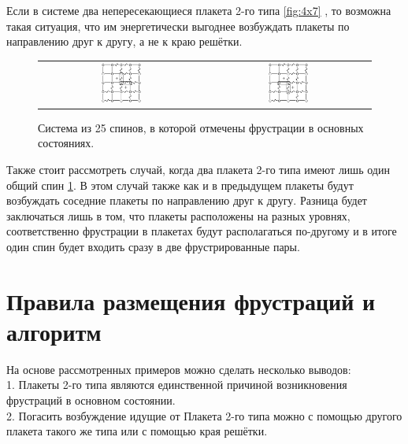 \documentclass[utf8, babel, sor, jor, amsmath, amssymb, reprint]{elsarticle} %
\begin{document}
Если в системе два непересекающиеся плакета 2-го типа \ref{fig:4x7} , то возможна такая ситуация, что им энергетически выгоднее возбуждать плакеты по направлению друг к другу, а не к краю решётки.

\begin{figure}[H]
	\centering
	\begin{tabular}{cc}
		\includegraphics[width=0.25\textwidth]{1_Cl5x5_Type2_gs1.eps} & \hspace{0.05\textwidth}
		\includegraphics[width=0.25\textwidth]{1_Cl5x5_Type2_gs2.eps} 
	\end{tabular}
	\caption{Система из 25 спинов, в которой отмечены фрустрации в основных состояниях.}
	\label{fig:5x5.22F}
\end{figure}

Также стоит рассмотреть случай, когда два плакета 2-го типа имеют лишь один общий спин \ref{fig:5x5.22F}.
В этом случай также как и в предыдущем плакеты будут возбуждать соседние плакеты по направлению друг к другу. Разница будет заключаться лишь в том, что плакеты расположены на разных уровнях, соответственно фрустрации в плакетах будут располагаться по-другому и в итоге один спин будет входить сразу в две фрустрированные пары.

\section{Правила размещения фрустраций и алгоритм}

На основе рассмотренных примеров можно сделать несколько выводов: \\
1. Плакеты 2-го типа являются единственной причиной возникновения фрустраций в основном состоянии.\\
2. Погасить возбуждение идущие от Плакета 2-го типа можно с помощью другого плакета такого же типа или с помощью края решётки.
\end{document}
